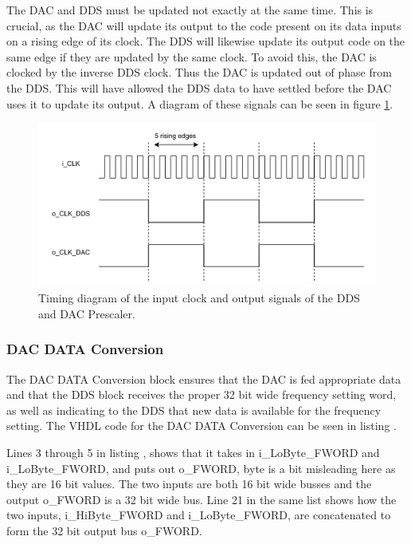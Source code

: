 The DAC and DDS must be updated not exactly at the same time. This is crucial, as the DAC will update its output to the code present on its data inputs on a rising edge of its clock. The DDS will likewise update its output code on the same edge if they are updated by the same clock. To avoid this, the DAC is clocked by the inverse DDS clock. Thus the DAC is updated  out of phase from the DDS. This will have allowed the DDS data to have settled before the DAC uses it to update its output. A diagram of these signals can be seen in figure \ref{fig:7_2_3_DAC_PRESCALER}.

\begin{figure}[H]
    \centering
    \includegraphics[clip, trim=0 0 0 0, width=1\textwidth]{Sections/7_SystemDesign/Figures/DAC_PRESCALER.pdf}
    \caption{Timing diagram of the input clock and output signals of the DDS and DAC Prescaler.}
    \label{fig:7_2_3_DAC_PRESCALER}
\end{figure}

\subsubsection{DAC DATA Conversion}
The DAC DATA Conversion block ensures that the DAC is fed appropriate data and that the DDS block receives the proper 32 bit wide frequency setting word, as well as indicating to the DDS that new data is available for the frequency setting. The VHDL code for the DAC DATA Conversion can be seen in listing .



Lines 3 through 5 in listing , shows that it takes in i\_LoByte\_FWORD and i\_LoByte\_FWORD, and puts out o\_FWORD, byte is a bit misleading here as they are 16 bit values. The two inputs are both 16 bit wide busses and the output o\_FWORD is a 32 bit wide bus. Line 21 in the same list shows how the two inputs, i\_HiByte\_FWORD and i\_LoByte\_FWORD, are concatenated to form the 32 bit output bus o\_FWORD.

